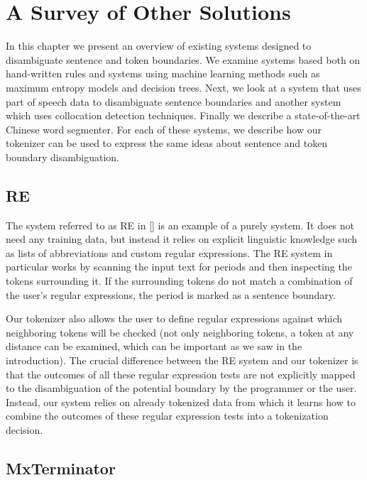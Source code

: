 \chapter{A Survey of Other Solutions}
\label{chap:survey}

In this chapter we present an overview of existing systems designed to
disambiguate sentence and token boundaries. We examine systems based both on
hand-written rules and systems using machine learning methods such as maximum
entropy models and decision trees. Next, we look at a system that uses part of
speech data to disambiguate sentence boundaries and another system which uses
collocation detection techniques. Finally we describe a state-of-the-art
Chinese word segmenter. For each of these systems, we describe how our
tokenizer can be used to express the same ideas about sentence and token
boundary disambiguation.

\section{RE}
\label{sec:survey-re}

The system referred to as RE in [] is an example of a purely
 system. It does not need any training data, but instead it
relies on explicit linguistic knowledge such as lists of abbreviations and
custom regular expressions. The RE system in particular works by scanning the
input text for periods and then inspecting the tokens surrounding it. If the
surrounding tokens do not match a combination of the user's regular
expressions, the period is marked as a sentence boundary.

Our tokenizer also allows the user to define regular expressions against which
neighboring tokens will be checked (not only neighboring tokens, a token at any
distance can be examined, which can be important as we saw in the
introduction). The crucial difference between the RE system and our tokenizer
is that the outcomes of all these regular expression tests are not explicitly
mapped to the disambiguation of the potential boundary by the programmer or the
user. Instead, our system relies on already tokenized data from which it learns
how to combine the outcomes of these regular expression tests into a
tokenization decision.

\section{MxTerminator}
\label{sec:survey-mxterm}

